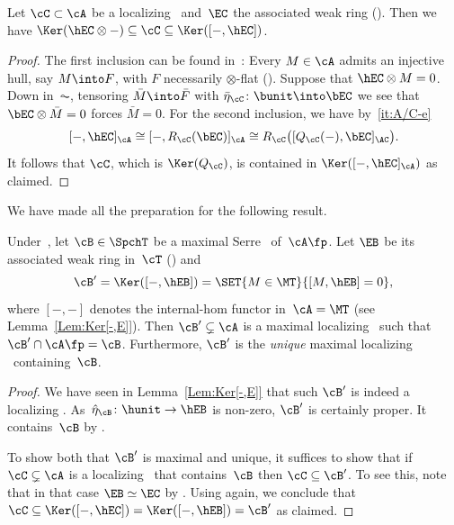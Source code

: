 \begin{Prop}
\label{Prop:Ker@<C<Ker[]}
Let $\cC\subset\cA$ be a localizing \tensid\ and~$\EC$ the associated weak ring (). Then we have $\Ker(\hEC\otimes-)\subseteq\cC\subseteq\Ker([-,\hEC])$.
\end{Prop}

\begin{proof}
The first inclusion can be found in~\cite{BalmerKrauseStevenson19}: Every $M\in\cA$ admits an injective hull, say $M\into F$, with $F$ necessarily $\otimes$-flat (). Suppose that $\hEC\otimes M=0$. Down in~$\AC$, tensoring $\bar M\into \bar F$ with $\bar\eta_\cC\colon \bunit\into \bEC$ we see that $\bEC\otimes \bar M=0$ forces $\bar M=0$. For the second inclusion, we have by \,\eqref{it:A/C-e}
\[
[-,\hEC]_{\cA}\cong[-,R_{\cC}(\bEC)]_{\cA}\cong R_{\cC}\big([Q_{\cC}(-),\bEC]_{\AC}\big).
\]
It follows that $\cC$, which is $\Ker(Q_{\cC})$, is contained in $\Ker([-,\hEC]_{\cA})$ as claimed.
\end{proof}

We have made all the preparation for the following result.
\begin{Thm}
\label{Thm:max-to-max}
Under~, let $\cB\in\SpchT$ be a maximal Serre \tensid\ of~$\cA\fp$. Let $\EB$ be its associated weak ring in~$\cT$ () and
\begin{equation}
\label{eq:max-vs-max}
{\cB'}=\Ker([-,\hEB])=\SET{M\in\MT}{[M,\hEB]=0},
\end{equation}
where $[-,-]$ denotes the internal-hom functor in~$\cA=\MT$ (see Lemma~\ref{Lem:Ker[-,E]}). Then $\cB'\subsetneq\cA$ is a maximal localizing \tensid\ such that $\cB'\cap \cA\fp=\cB$. Furthermore, $\cB'$ is the \emph{unique} maximal localizing \tensid\ containing~$\cB$.
\end{Thm}

\begin{proof}
We have seen in Lemma~\ref{Lem:Ker[-,E]} that such $\cB'$ is indeed a localizing \tensid. As~$\hat\eta_\cB\colon \hunit\to \hEB$ is non-zero, $\cB'$ is certainly proper. It contains~$\cB$ by .

To show both that $\cB'$ is maximal and unique, it suffices to show that if $\cC\subsetneq\cA$ is a localizing \tensid\ that contains~$\cB$ then $\cC\subseteq\cB'$. To see this, note that in that case $\EB\simeq\EC$ by . Using  again, we conclude that $\cC\subseteq\Ker([-,\hEC])=\Ker([-,\hEB])=\cB'$ as claimed.
\end{proof}

